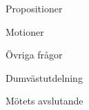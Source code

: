 \documentclass[prelim]{sektionsmote}
\begin{document}
\begin{ootd}
\item{Propositioner}

\item{Motioner}

\item{Övriga frågor}

\item{Dumvästutdelning}

\item{Mötets avslutande}
\end{ootd}

\begin{bilagor}
    
    

\end{bilagor}
\end{document}
